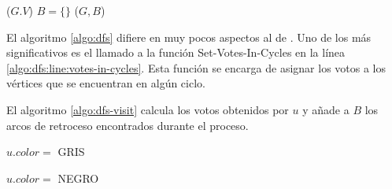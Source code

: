 \begin{algorithm}[!h]
    \caption{\dfscaption}
    \label{algo:dfs}
    \DontPrintSemicolon
    \SetAlgoLined
    \BlankLine

    \initdfsvertices($G.V$)\;
    $B = \{\}$\;
    \cyclevotescaption($G, B$)\; \label{algo:dfs:line:votes-in-cycles}
\end{algorithm}

\begin{algorithm}[!h]
    \caption{\initdfsvertices}
    \label{algo:init-dfs-vertices}
    \DontPrintSemicolon
    \SetAlgoLined
    \BlankLine

\end{algorithm}

El algoritmo \ref{algo:dfs} difiere en muy pocos aspectos al de \cite{intro-to-algo-3}. Uno de los m\'as significativos es el llamado a la funci\'on Set-Votes-In-Cycles en la l\'inea \ref{algo:dfs:line:votes-in-cycles}. Esta funci\'on se encarga de asignar los votos a los v\'ertices que se encuentran en alg\'un ciclo.  

El algoritmo \ref{algo:dfs-visit} calcula los votos obtenidos por $u$ y a\~nade a $B$ los arcos de retroceso encontrados durante el proceso.

\begin{algorithm}[!h]
    \caption{\dfsvisitcaption}
    \label{algo:dfs-visit}
    \DontPrintSemicolon
    \SetAlgoLined
    \BlankLine

    $u.color =$ GRIS\;

    $u.color =$ NEGRO\;
\end{algorithm}


